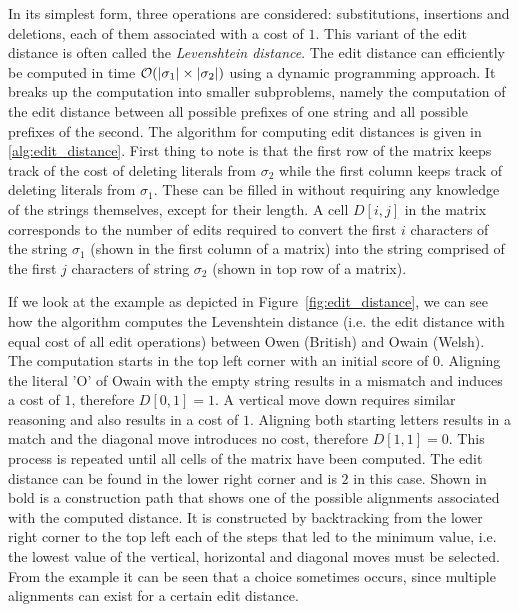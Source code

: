 In its simplest form, three operations are considered: substitutions, insertions and deletions, each of them associated with a cost of $1$.
This variant of the edit distance is often called the \emph{Levenshtein distance}.
The edit distance can efficiently be computed in time $\mathcal{O}(\lvert\sigma_1\rvert \times \lvert\sigma_2\rvert)$ using a dynamic programming approach.
It breaks up the computation into smaller subproblems, namely the computation of the edit distance between all possible prefixes of one string and all possible prefixes of the second.
The algorithm for computing edit distances is given in \cref{alg:edit_distance}.
First thing to note is that the first row of the matrix keeps track of the cost of deleting literals from $\sigma_{2}$ while the first column keeps track of deleting literals from $\sigma_{1}$.
These can be filled in without requiring any knowledge of the strings themselves, except for their length.
A cell $D[i,j]$ in the matrix corresponds to the number of edits required to convert the first $i$ characters of the string $\sigma_1$ (shown in the first column of a matrix) into the string comprised of the first $j$ characters of string $\sigma_2$ (shown in top row of a matrix).\citep{Christen2012}

If we look at the example as depicted in Figure~\ref{fig:edit_distance}, we can see how the algorithm computes the Levenshtein distance (i.e. the edit distance with equal cost of all edit operations) between Owen (British) and Owain (Welsh).
The computation starts in the top left corner with an initial score of $0$.
Aligning the literal 'O' of Owain with the empty string results in a mismatch and induces a cost of $1$, therefore $D[0, 1]=1$.
A vertical move down requires similar reasoning and also results in a cost of $1$.
Aligning both starting letters results in a match and the diagonal move introduces no cost, therefore $D[1, 1]=0$.
This process is repeated until all cells of the matrix have been computed.
The edit distance can be found in the lower right corner and is $2$ in this case.
Shown in bold is a construction path that shows one of the possible alignments associated with the computed distance.
It is constructed by backtracking from the lower right corner to the top left each of the steps that led to the minimum value, i.e. the lowest value of the vertical, horizontal and diagonal moves must be selected.
From the example it can be seen that a choice sometimes occurs, since multiple alignments can exist for a certain edit distance.

